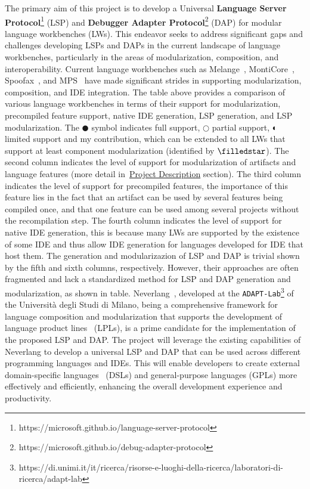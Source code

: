 The primary aim of this project is to develop a Universal \textbf{Language Server Protocol}\footnote{https://microsoft.github.io/language-server-protocol} (LSP) and \textbf{Debugger Adapter Protocol}\footnote{https://microsoft.github.io/debug-adapter-protocol} (DAP) for modular language workbenches (LWs). This endeavor seeks to address significant gaps and challenges developing LSPs and DAPs in the current landscape of language workbenches, particularly in the areas of modularization, composition, and interoperability. Current language workbenches such as Melange~\cite{Degueule15}, MontiCore~\cite{Krahn10}, Spoofax~\cite{Visser10}, and MPS~\cite{Volter11, Voelter12} have made significant strides in supporting modularization, composition, and IDE integration.
The table above provides a comparison of various language workbenches in terms of their support for modularization, precompiled feature support, native IDE generation, LSP generation, and LSP modularization. The $\CIRCLE$ symbol indicates full support, $\Circle$ partial support, $\LEFTcircle$ limited support and \FiveStarConvex my contribution, which can be extended to all LWs that support at least component modularization (identified by $\filledstar$).
The second column indicates the level of support for modularization of artifacts and language features (more detail in~\hyperref[project-description]{Project Description} section). The third column indicates the level of support for precompiled features, the importance of this feature lies in the fact that an artifact can be used by several features being compiled once, and that one feature can be used among several projects without the recompilation step.  The fourth column indicates the level of support for native IDE generation, this is because many LWs are supported by the existence of some IDE and thus allow IDE generation for languages developed for IDE that host them.
The generation and modularizazion of LSP and DAP is trivial shown by the fifth and sixth columns, respectively.
However, their approaches are often fragmented and lack a standardized method for LSP and DAP generation and modularization, as shown in table.
Neverlang~\cite{Cazzola15c, Cazzola14c}, developed at the \texttt{ADAPT-Lab}\footnote{https://di.unimi.it/it/ricerca/risorse-e-luoghi-della-ricerca/laboratori-di-ricerca/adapt-lab} of the Università degli Studi di Milano, being a comprehensive framework for language composition and modularization that supports the development of language product lines~\cite{Cazzola15f, Cazzola21b} (LPLs), is a prime candidate for the implementation of the proposed LSP and DAP. The project will leverage the existing capabilities of Neverlang to develop a universal LSP and DAP that can be used across different programming languages and IDEs. This will enable developers to create external domain-specific languages~\cite{Fowler10} (DSLs) and general-purpose languages (GPLs) more effectively and efficiently, enhancing the overall development experience and productivity.


